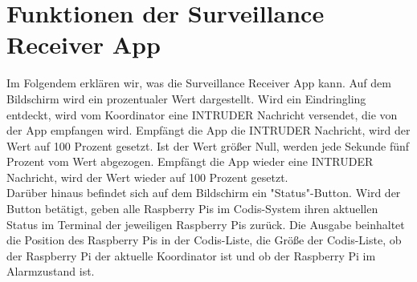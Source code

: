 \documentclass[12pt,a4paper]{scrreprt}
\begin{document}
\section{Funktionen der Surveillance Receiver App}

Im Folgendem erklären wir, was die Surveillance Receiver App kann. Auf dem Bildschirm wird ein prozentualer Wert dargestellt. Wird ein Eindringling entdeckt, wird vom Koordinator eine INTRUDER Nachricht versendet, die von der App empfangen wird. Empfängt die App die INTRUDER Nachricht, wird der Wert auf 100 Prozent gesetzt. Ist der Wert größer Null, werden jede Sekunde fünf Prozent vom Wert abgezogen. Empfängt die App wieder eine INTRUDER Nachricht, wird der Wert wieder auf 100 Prozent gesetzt. \\
Darüber hinaus befindet sich auf dem Bildschirm ein "Status"-Button. Wird der Button betätigt, geben alle Raspberry Pis im Codis-System ihren aktuellen Status im Terminal der jeweiligen Raspberry Pis zurück. Die Ausgabe beinhaltet die Position des Raspberry Pis in der Codis-Liste, die Größe der Codis-Liste, ob der Raspberry Pi der aktuelle Koordinator ist und ob der Raspberry Pi im Alarmzustand ist.
\end{document}
